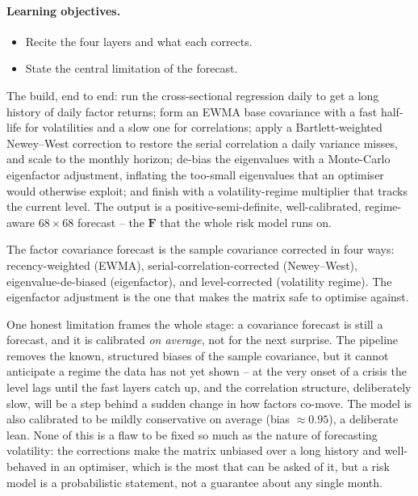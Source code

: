 \documentclass[11pt]{article}
\theoremstyle{definition}
\theoremstyle{plain}
\theoremstyle{remark}
\newcommand{\Fmat}{\mathbf{F}}
\begin{document}
\paragraph{Learning objectives.}
\begin{itemize}[leftmargin=1.4em,topsep=2pt]
  \item Recite the four layers and what each corrects.
  \item State the central limitation of the forecast.
\end{itemize}

The build, end to end: run the cross-sectional regression daily to get a long history of daily factor returns; form an EWMA base covariance with a fast half-life for volatilities and a slow one for correlations; apply a Bartlett-weighted Newey--West correction to restore the serial correlation a daily variance misses, and scale to the monthly horizon; de-bias the eigenvalues with a Monte-Carlo eigenfactor adjustment, inflating the too-small eigenvalues that an optimiser would otherwise exploit; and finish with a volatility-regime multiplier that tracks the current level. The output is a positive-semi-definite, well-calibrated, regime-aware $68\times68$ forecast -- the $\Fmat$ that the whole risk model runs on.

\begin{keyresult}
The factor covariance forecast is the sample covariance corrected in four ways: recency-weighted (EWMA), serial-correlation-corrected (Newey--West), eigenvalue-de-biased (eigenfactor), and level-corrected (volatility regime). The eigenfactor adjustment is the one that makes the matrix safe to optimise against.
\end{keyresult}

\begin{pitfall}
One honest limitation frames the whole stage: a covariance forecast is still a forecast, and it is calibrated \emph{on average}, not for the next surprise. The pipeline removes the known, structured biases of the sample covariance, but it cannot anticipate a regime the data has not yet shown -- at the very onset of a crisis the level lags until the fast layers catch up, and the correlation structure, deliberately slow, will be a step behind a sudden change in how factors co-move. The model is also calibrated to be mildly conservative on average (bias $\approx 0.95$), a deliberate lean. None of this is a flaw to be fixed so much as the nature of forecasting volatility: the corrections make the matrix unbiased over a long history and well-behaved in an optimiser, which is the most that can be asked of it, but a risk model is a probabilistic statement, not a guarantee about any single month.
\end{pitfall}
\end{document}
